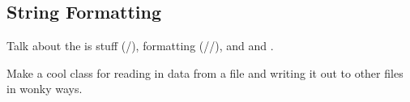 \subsection*{String Formatting}

Talk about the is stuff (/), formatting (//), and  and . 

\begin{problem}
Make a cool class for reading in data from a file and writing it out to other files in wonky ways.
\end{problem}
